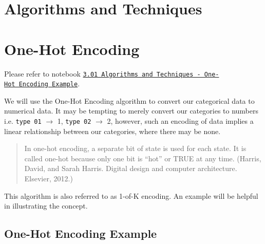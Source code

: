 \documentclass[]{report}
\begin{document}
\chapter{Algorithms and Techniques}

\chapter{One-Hot Encoding}\label{one-hot-encoding}

Please refer to notebook
\href{http://joshuacook.me:8003/notebooks/ipynb/3.01\%20Algorithms\%20and\%20Techniques\%20-\%20One-Hot\%20Encoding\%20Example.ipynb}{\texttt{3.01\ Algorithms\ and\ Techniques\ -\ One-Hot\ Encoding\ Example}}.

We will use the One-Hot Encoding algorithm to convert our categorical
data to numerical data. It may be tempting to merely convert our
categories to numbers i.e. \texttt{type\ 01} \(\to\) 1,
\texttt{type\ 02} \(\to\) 2, however, such an encoding of data implies a
linear relationship between our categories, where there may be none.

\begin{quote}
In one-hot encoding, a separate bit of state is used for each state. It
is called one-hot because only one bit is ``hot'' or TRUE at any time.
(Harris, David, and Sarah Harris. Digital design and computer
architecture. Elsevier, 2012.)
\end{quote}

This algorithm is also referred to as 1-of-K encoding. An example will
be helpful in illustrating the concept.

\pagebreak

\section{One-Hot Encoding Example}\label{one-hot-encoding-example}
\end{document}
